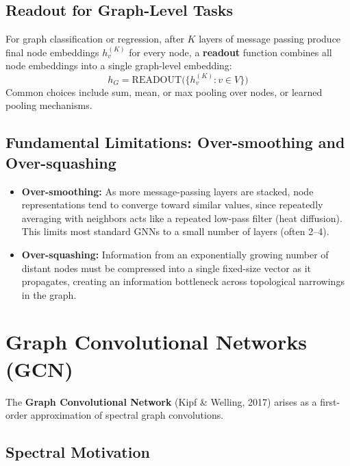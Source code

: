 \documentclass[12pt,a4paper]{article}
\begin{document}
\subsection{Readout for Graph-Level Tasks}

For graph classification or regression, after $K$ layers of message passing produce final node embeddings $h_v^{(K)}$ for every node, a \textbf{readout} function combines all node embeddings into a single graph-level embedding:
\[
h_G = \text{READOUT}\big(\{h_v^{(K)} : v \in V\}\big)
\]
Common choices include sum, mean, or max pooling over nodes, or learned pooling mechanisms.

\subsection{Fundamental Limitations: Over-smoothing and Over-squashing}

\begin{itemize}
    \item \textbf{Over-smoothing:} As more message-passing layers are stacked, node representations tend to converge toward similar values, since repeatedly averaging with neighbors acts like a repeated low-pass filter (heat diffusion). This limits most standard GNNs to a small number of layers (often 2--4).
    \item \textbf{Over-squashing:} Information from an exponentially growing number of distant nodes must be compressed into a single fixed-size vector as it propagates, creating an information bottleneck across topological narrowings in the graph.
\end{itemize}

\vspace{0.5cm}

\section{Graph Convolutional Networks (GCN)}

The \textbf{Graph Convolutional Network} (Kipf \& Welling, 2017) arises as a first-order approximation of spectral graph convolutions.

\subsection{Spectral Motivation}
\end{document}
